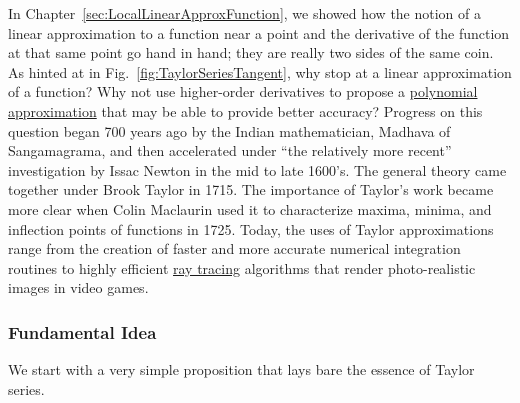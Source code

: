   In Chapter~\ref{sec:LocalLinearApproxFunction}, we showed how the notion of a linear approximation to a function near a point and the derivative of the function at that same point go hand in hand; they are really two sides of the same coin. As hinted at in Fig.~\ref{fig:TaylorSeriesTangent}, why stop at a linear approximation of a function? Why not use higher-order derivatives to propose a \href{https://en.wikipedia.org/wiki/Taylor_series}{polynomial approximation} that may be able to provide better accuracy? Progress on this question began 700 years ago by the Indian mathematician, Madhava of Sangamagrama, and then accelerated under ``the relatively more recent'' investigation by Issac Newton in the mid to late 1600's. The general theory came together under Brook Taylor in 1715. The importance of Taylor's work became more clear when Colin Maclaurin used it to characterize maxima, minima, and inflection points of functions in 1725. Today, the uses of Taylor approximations range from the creation of faster and more accurate numerical integration routines to highly efficient \href{https://developer.nvidia.com/rtx/ray-tracing}{ray tracing} algorithms that render photo-realistic images in video games. 

  \subsubsection{Fundamental Idea}

 We start with a very simple proposition that lays bare the essence of Taylor series.
 \bigskip


